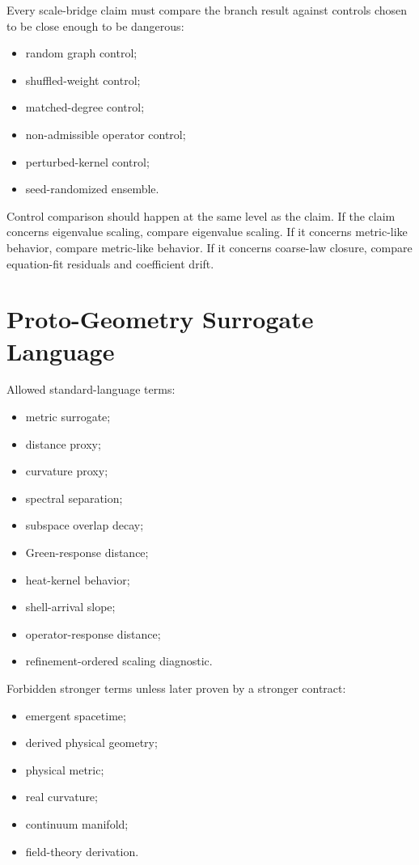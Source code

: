 \documentclass[11pt]{article}
\begin{document}
Every scale-bridge claim must compare the branch result against controls chosen to be close enough to be dangerous:
\begin{itemize}
\item random graph control;
\item shuffled-weight control;
\item matched-degree control;
\item non-admissible operator control;
\item perturbed-kernel control;
\item seed-randomized ensemble.
\end{itemize}

Control comparison should happen at the same level as the claim. If the claim concerns eigenvalue scaling, compare eigenvalue scaling. If it concerns metric-like behavior, compare metric-like behavior. If it concerns coarse-law closure, compare equation-fit residuals and coefficient drift.

\section{Proto-Geometry Surrogate Language}

Allowed standard-language terms:
\begin{itemize}
\item metric surrogate;
\item distance proxy;
\item curvature proxy;
\item spectral separation;
\item subspace overlap decay;
\item Green-response distance;
\item heat-kernel behavior;
\item shell-arrival slope;
\item operator-response distance;
\item refinement-ordered scaling diagnostic.
\end{itemize}

Forbidden stronger terms unless later proven by a stronger contract:
\begin{itemize}
\item emergent spacetime;
\item derived physical geometry;
\item physical metric;
\item real curvature;
\item continuum manifold;
\item field-theory derivation.
\end{itemize}
\end{document}
